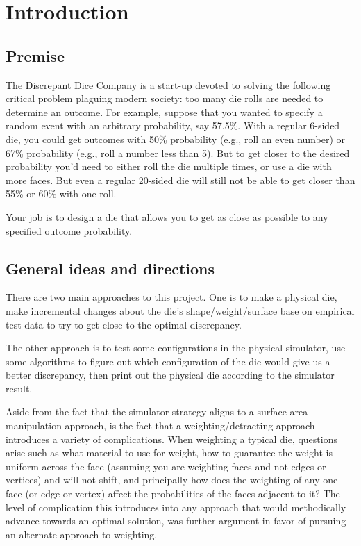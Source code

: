 \section{Introduction}
\subsection{Premise}
The Discrepant Dice Company is a start-up devoted to solving the following critical problem plaguing modern society: too many die rolls are needed to determine an outcome. For example, suppose that you wanted to specify a random event with an arbitrary probability, say 57.5\%. With a regular 6-sided die, you could get outcomes with 50\% probability (e.g., roll an even number) or 67\% probability (e.g., roll a number less than 5). But to get closer to the desired probability you'd need to either roll the die multiple times, or use a die with more faces. But even a regular 20-sided die will still not be able to get closer than 55\% or 60\% with one roll.

Your job is to design a die that allows you to get as close as possible to any specified outcome probability.

\subsection{General ideas and directions}
There are two main approaches to this project. One is to make a physical die, make incremental changes about the die's shape/weight/surface base on empirical test data to try to get close to the optimal discrepancy.

The other approach is to test some configurations in the physical simulator, use some algorithms to figure out which configuration of the die would give us a better discrepancy, then print out the physical die according to the simulator result.

Aside from the fact that the simulator strategy aligns to a surface-area manipulation approach, is the fact that a weighting/detracting approach introduces a variety of complications. When weighting a typical die, questions arise such as what material to use for weight, how to guarantee the weight is uniform across the face (assuming you are weighting faces and not edges or vertices) and will not shift, and principally how does the weighting of any one face (or edge or vertex) affect the probabilities of the faces adjacent to it? The level of complication this introduces into any approach that would methodically advance towards an optimal solution, was further argument in favor of pursuing an alternate approach to weighting.

